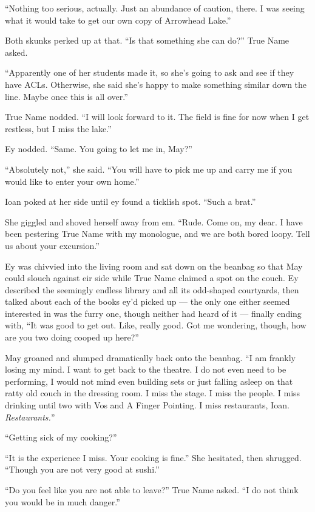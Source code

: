 ``Nothing too serious, actually. Just an abundance of caution, there. I was seeing what it would take to get our own copy of Arrowhead Lake.''

Both skunks perked up at that. ``Is that something she can do?'' True Name asked.

``Apparently one of her students made it, so she's going to ask and see if they have ACLs. Otherwise, she said she's happy to make something similar down the line. Maybe once this is all over.''

True Name nodded. ``I will look forward to it. The field is fine for now when I get restless, but I miss the lake.''

Ey nodded. ``Same. You going to let me in, May?''

``Absolutely not,'' she said. ``You will have to pick me up and carry me if you would like to enter your own home.''

Ioan poked at her side until ey found a ticklish spot. ``Such a brat.''

She giggled and shoved herself away from em. ``Rude. Come on, my dear. I have been pestering True Name with my monologue, and we are both bored loopy. Tell us about your excursion.''

Ey was chivvied into the living room and sat down on the beanbag so that May could slouch against eir side while True Name claimed a spot on the couch. Ey described the seemingly endless library and all its odd-shaped courtyards, then talked about each of the books ey'd picked up — the only one either seemed interested in was the furry one, though neither had heard of it — finally ending with, ``It was good to get out. Like, really good. Got me wondering, though, how are you two doing cooped up here?''

May groaned and slumped dramatically back onto the beanbag. ``I am frankly losing my mind. I want to get back to the theatre. I do not even need to be performing, I would not mind even building sets or just falling asleep on that ratty old couch in the dressing room. I miss the stage. I miss the people. I miss drinking until two with Vos and A Finger Pointing. I miss restaurants, Ioan. \emph{Restaurants.}''

``Getting sick of my cooking?''

``It is the experience I miss. Your cooking is fine.'' She hesitated, then shrugged. ``Though you are not very good at sushi.''

``Do you feel like you are not able to leave?'' True Name asked. ``I do not think you would be in much danger.''

